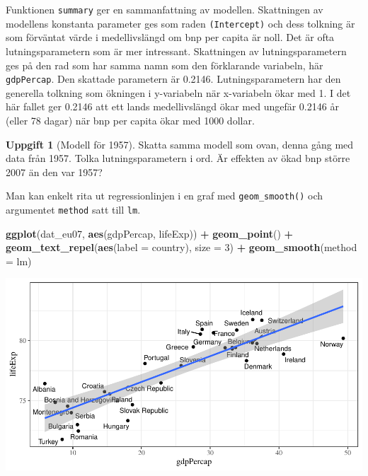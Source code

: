 \documentclass[
]{book}
\newenvironment{Shaded}{\begin{snugshade}}{\end{snugshade}}
\newcommand{\AttributeTok}[1]{\textcolor[rgb]{0.13,0.29,0.53}{#1}}
\newcommand{\DecValTok}[1]{\textcolor[rgb]{0.00,0.00,0.81}{#1}}
\newcommand{\FunctionTok}[1]{\textcolor[rgb]{0.13,0.29,0.53}{\textbf{#1}}}
\newcommand{\NormalTok}[1]{#1}
\newcommand{\SpecialCharTok}[1]{\textcolor[rgb]{0.81,0.36,0.00}{\textbf{#1}}}
\theoremstyle{definition}
\theoremstyle{definition}
\theoremstyle{definition}
\newtheorem{exercise}{Uppgift}[chapter]
\theoremstyle{definition}
\theoremstyle{remark}
\begin{document}
Funktionen \texttt{summary} ger en sammanfattning av modellen. Skattningen av modellens konstanta parameter ges som raden \texttt{(Intercept)} och dess tolkning är som förväntat värde i medellivslängd om bnp per capita är noll. Det är ofta lutningsparametern som är mer intressant. Skattningen av lutningsparametern ges på den rad som har samma namn som den förklarande variabeln, här \texttt{gdpPercap}. Den skattade parametern är 0.2146. Lutningsparametern har den generella tolkning som ökningen i y-variabeln när x-variabeln ökar med 1. I det här fallet ger 0.2146 att ett lands medellivslängd ökar med ungefär 0.2146 år (eller 78 dagar) när bnp per capita ökar med 1000 dollar.

\begin{exercise}[Modell för 1957]
Skatta samma modell som ovan, denna gång med data från 1957. Tolka lutningsparametern i ord. Är effekten av ökad bnp större 2007 än den var 1957?
\end{exercise}

Man kan enkelt rita ut regressionlinjen i en graf med \texttt{geom\_smooth()} och argumentet \texttt{method} satt till \texttt{lm}.

\begin{Shaded}
\begin{Highlighting}[]
\FunctionTok{ggplot}\NormalTok{(dat\_eu07, }\FunctionTok{aes}\NormalTok{(gdpPercap, lifeExp)) }\SpecialCharTok{+}
  \FunctionTok{geom\_point}\NormalTok{() }\SpecialCharTok{+}
  \FunctionTok{geom\_text\_repel}\NormalTok{(}\FunctionTok{aes}\NormalTok{(}\AttributeTok{label =}\NormalTok{ country), }\AttributeTok{size =} \DecValTok{3}\NormalTok{) }\SpecialCharTok{+}
  \FunctionTok{geom\_smooth}\NormalTok{(}\AttributeTok{method =}\NormalTok{ lm)}
\end{Highlighting}
\end{Shaded}

\begin{center}\includegraphics{R-anvisningar_files/figure-latex/unnamed-chunk-268-1} \end{center}
\end{document}
